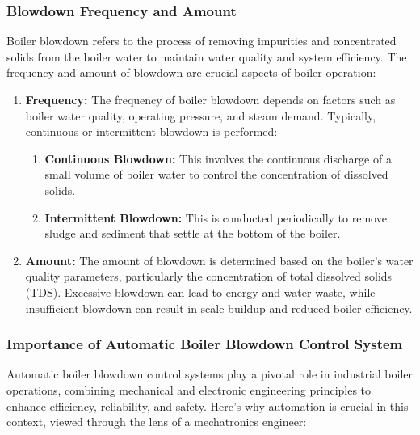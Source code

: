 \subsubsection{Blowdown Frequency and Amount}

Boiler blowdown refers to the process of removing impurities and concentrated solids from the boiler water to maintain water quality and system efficiency. The frequency and amount of blowdown are crucial aspects of boiler operation:

\begin{enumerate}
    \item \textbf{Frequency:} The frequency of boiler blowdown depends on factors such as boiler water quality, operating pressure, and steam demand. Typically, continuous or intermittent blowdown is performed:
    \begin{enumerate}
        \item \textbf{Continuous Blowdown:} This involves the continuous discharge of a small volume of boiler water to control the concentration of dissolved solids.
        \item \textbf{Intermittent Blowdown:} This is conducted periodically to remove sludge and sediment that settle at the bottom of the boiler.
    \end{enumerate}
    \item \textbf{Amount:} The amount of blowdown is determined based on the boiler's water quality parameters, particularly the concentration of total dissolved solids (TDS). Excessive blowdown can lead to energy and water waste, while insufficient blowdown can result in scale buildup and reduced boiler efficiency.
\end{enumerate}

\subsubsection{Importance of Automatic Boiler Blowdown Control System}

Automatic boiler blowdown control systems play a pivotal role in industrial boiler operations, combining mechanical and electronic engineering principles to enhance efficiency, reliability, and safety. Here’s why automation is crucial in this context, viewed through the lens of a mechatronics engineer:

